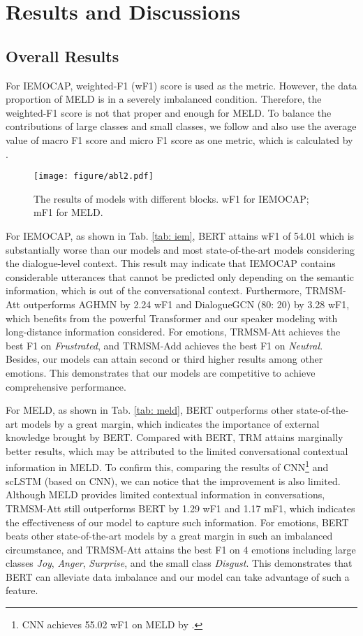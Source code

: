 \documentclass[letterpaper]{article} \usepackage{aaai21}  \usepackage{times}  \usepackage{helvet} \usepackage{courier}  \usepackage[hyphens]{url}  \usepackage{graphicx} \urlstyle{rm} \def\UrlFont{\rm}  \usepackage{natbib}  \usepackage{caption} \usepackage{multirow}
\begin{document}
\section{Results and Discussions}

\subsection{Overall Results}

For IEMOCAP, weighted-F1 (wF1) score is used as the metric. However, the data proportion of MELD is in a severely imbalanced condition. Therefore, the weighted-F1 score is not that proper and enough for MELD. To balance the contributions of large classes and small classes, we follow \citet{Stance} and also use the average value of macro F1 score and micro F1 score as one metric, which is calculated by . 

\begin{figure}
    \centering
    \texttt{[image: figure/abl2.pdf]}
    \caption{The results of models with different blocks. wF1 for IEMOCAP; mF1 for MELD.}
    \label{fig: ablation}
\end{figure}

For IEMOCAP, as shown in Tab. \ref{tab: iem}, BERT attains wF1 of 54.01 which is substantially worse than our models and most state-of-the-art models considering the dialogue-level context. This result may indicate that IEMOCAP contains considerable utterances that cannot be predicted only depending on the semantic information, which is out of the conversational context. Furthermore, TRMSM-Att outperforms AGHMN by 2.24 wF1 and DialogueGCN (80: 20) by 3.28 wF1, which benefits from the powerful Transformer and our speaker modeling with long-distance information considered. For emotions, TRMSM-Att achieves the best F1 on \textit{Frustrated}, and TRMSM-Add achieves the best F1 on \textit{Neutral}. Besides, our models can attain second or third higher results among other emotions. This demonstrates that our models are competitive to achieve comprehensive performance. 

For MELD, as shown in Tab. \ref{tab: meld}, BERT outperforms other state-of-the-art models by a great margin, which indicates the importance of external knowledge brought by BERT.  Compared with BERT, TRM attains marginally better results, which may be attributed to the limited conversational contextual information in MELD. To confirm this, comparing the results of CNN\footnote{CNN achieves 55.02 wF1 on MELD by \citet{Survey}.} and scLSTM (based on CNN), we can notice that the improvement is also limited. Although MELD provides limited contextual information in conversations, TRMSM-Att still outperforms BERT by 1.29 wF1 and 1.17 mF1, which indicates the effectiveness of our model to capture such information. For emotions, BERT beats other state-of-the-art models by a great margin in such an imbalanced circumstance, and TRMSM-Att attains the best F1 on 4 emotions including large classes \textit{Joy}, \textit{Anger}, \textit{Surprise}, and the small class \textit{Disgust}. This demonstrates that BERT can alleviate data imbalance and our model can take advantage of such a feature. 
\end{document}
